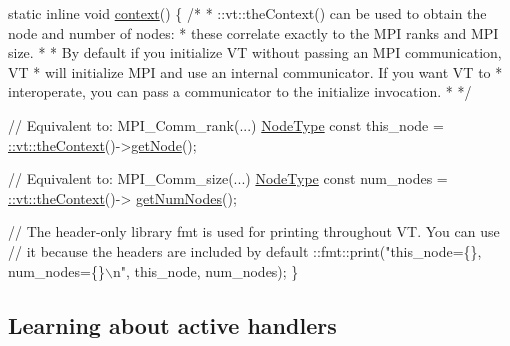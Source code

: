 \begin{DoxyCodeInclude}
\textcolor{keyword}{static} \textcolor{keyword}{inline} \textcolor{keywordtype}{void} \hyperlink{namespacevt_1_1config_a6bd1d6215bda0d8ca02811798399f689a5dad3be974af03e75e234cb475c2cb20}{context}() \{
  \textcolor{comment}{/*}
\textcolor{comment}{   *  ::vt::theContext() can be used to obtain the node and number of nodes:}
\textcolor{comment}{   *  these correlate exactly to the MPI ranks and MPI size.}
\textcolor{comment}{   *}
\textcolor{comment}{   *  By default if you initialize VT without passing an MPI communication, VT}
\textcolor{comment}{   *  will initialize MPI and use an internal communicator. If you want VT to}
\textcolor{comment}{   *  interoperate, you can pass a communicator to the initialize invocation.}
\textcolor{comment}{   *}
\textcolor{comment}{   */}

  \textcolor{comment}{// Equivalent to: MPI\_Comm\_rank(...)}
  \hyperlink{namespacevt_a866da9d0efc19c0a1ce79e9e492f47e2}{NodeType} \textcolor{keyword}{const} this\_node = \hyperlink{namespacevt_a26551fe0e6e6a1371111df5b12c7e92c}{::vt::theContext}()->\hyperlink{structvt_1_1ctx_1_1_context_a0d52c263ce8516546a67443d9a86fa5f}{getNode}();

  \textcolor{comment}{// Equivalent to: MPI\_Comm\_size(...)}
  \hyperlink{namespacevt_a866da9d0efc19c0a1ce79e9e492f47e2}{NodeType} \textcolor{keyword}{const} num\_nodes = \hyperlink{namespacevt_a26551fe0e6e6a1371111df5b12c7e92c}{::vt::theContext}()->
      \hyperlink{structvt_1_1ctx_1_1_context_a7f41071aadf6d5fa9e1b6c703c5ff19d}{getNumNodes}();

  \textcolor{comment}{// The header-only library fmt is used for printing throughout VT. You can use}
  \textcolor{comment}{// it because the headers are included by default}
  ::fmt::print(\textcolor{stringliteral}{"this\_node=\{\}, num\_nodes=\{\}\(\backslash\)n"}, this\_node, num\_nodes);
\}
\end{DoxyCodeInclude}
\hypertarget{tutorial-1b}{}\subsection{Learning about active handlers}\label{tutorial-1b}


